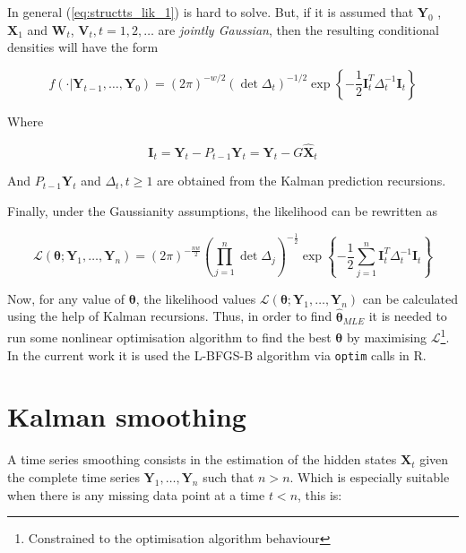 In general (\ref{eq:structts_lik_1}) is hard to solve. But, if it is assumed that $\bm{Y}_0$ , $\bm{X}_1$ and $\bm{W}_t$, $\bm{V}_t, t=1,2,\ldots$ are \emph{jointly Gaussian}, then the resulting conditional densities will have the form\cite{brockwell2016introduction}

\begin{equation}
	f(\cdot | \bm{Y}_{t-1}, \ldots, \bm{Y}_0) =  \left(2 \pi\right)^{-w/2} \left(\det \Delta_t\right)^{-1/2} \exp \left\{-\frac{1}{2} \bm{I}_t^T \Delta_t^{-1}\bm{I}_t\right\}
\end{equation}

Where 

\begin{equation}
	\bm{I}_t = \bm{Y}_t - P_{t-1} \bm{Y}_t = \bm{Y}_t - G \hat{\bm{X}}_t
\end{equation}

And $P_{t-1} \bm{Y}_t$ and $\Delta_t, t \geq 1$ are obtained from the Kalman prediction recursions.

Finally, under the Gaussianity assumptions, the likelihood can be rewritten as\cite{brockwell2016introduction}

\begin{equation}\label{eq:structts_lik_2}
	\mathcal{L}(\bm{\theta} ; \bm{Y}_1, \ldots, \bm{Y}_n) =
	\left(2 \pi\right)^{-\frac{nw}{2}} 
	\left( \prod_{j=1}^{n}{\det \Delta_j} \right)^{-\frac{1}{2}}
	\exp\left\{ - \frac{1}{2} \sum_{j=1}^{n}{\bm{I}_t^T \Delta_t^{-1}\bm{I}_t} \right\}
\end{equation} 

Now, for any value of $\bm{\theta}$, the likelihood values $\mathcal{L}(\bm{\theta} ; \bm{Y}_1, \ldots, \bm{Y}_n)$ can be calculated using the help of Kalman recursions. Thus, in order to find $\hat{\bm{\theta}}_{MLE}$ it is needed to run some nonlinear optimisation algorithm to find the best $\bm{\theta}$ by maximising $\mathcal{L}$\footnote{Constrained to the optimisation algorithm behaviour}. In the current work it is used the L-BFGS-B algorithm via \texttt{optim} calls in R.

\pagebreak
\section{Kalman smoothing}

A time series smoothing consists in the estimation of the hidden states $\bm{X}_t$ given the complete time series $\bm{Y}_1, \ldots, \bm{Y}_n$ such that $n > n$\cite{timeseries_statespace_models}. Which is especially suitable when there is any missing data point at a time $t < n$, this is:

